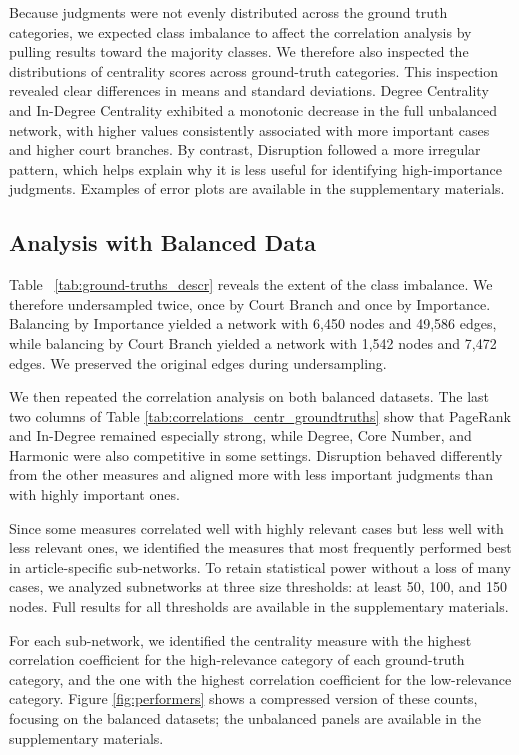 \documentclass[sigconf]{acmart}
\begin{document}
Because judgments were not evenly distributed across the ground truth categories, we expected class imbalance to affect the correlation analysis by pulling results toward the majority classes. We therefore also inspected the distributions of centrality scores across ground-truth categories.
This inspection revealed clear differences in means and standard deviations. Degree Centrality and In-Degree Centrality exhibited a monotonic decrease in the full unbalanced network, with higher values consistently associated with more important cases and higher court branches. By contrast, Disruption followed a more irregular pattern, which helps explain why it is less useful for identifying high-importance judgments. Examples of error plots are available in the supplementary materials.


\subsection{Analysis with Balanced Data}

Table ~\ref{tab:ground-truths_descr} reveals the extent of the class imbalance. We therefore undersampled twice, once by Court Branch and once by Importance. Balancing by Importance yielded a network with 6,450 nodes and 49,586 edges, while balancing by Court Branch yielded a network with 1,542 nodes and 7,472 edges. We preserved the original edges during undersampling.

We then repeated the correlation analysis on both balanced datasets. The last two columns of Table \ref{tab:correlations_centr_groundtruths} show that PageRank and In-Degree remained especially strong, while Degree, Core Number, and Harmonic were also competitive in some settings. Disruption behaved differently from the other measures and aligned more with less important judgments than with highly important ones.

Since some measures correlated well with highly relevant cases but less well with less relevant ones, we identified the measures that most frequently performed best in article-specific sub-networks. To retain statistical power without a loss of many cases, we analyzed subnetworks at three size thresholds: at least 50, 100, and 150 nodes. Full results for all thresholds are available in the supplementary materials.

For each sub-network, we identified the centrality measure with the highest correlation coefficient for the high-relevance category of each ground-truth category, and the one with the highest correlation coefficient for the low-relevance category. Figure \ref{fig:performers} shows a compressed version of these counts, focusing on the balanced datasets; the unbalanced panels are available in the supplementary materials.
\end{document}
